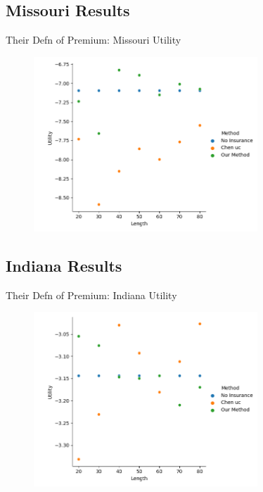 \documentclass{beamer}
\begin{document}
\subsection*{Missouri Results}
\begin{frame}{Their Defn of Premium: Missouri Utility}
    \begin{figure}
        \includegraphics[width=0.75\textwidth]{../../../output/figures/Chen Premium/Missouri_Utility_Length_ml1241.png}
    \end{figure}
\end{frame}

\subsection*{Indiana Results}
\begin{frame}{Their Defn of Premium: Indiana Utility}
    \begin{figure}
        \includegraphics[width=0.75\textwidth]{../../../output/figures/Chen Premium/Indiana_Utility_Length_ml1241.png}
    \end{figure}
\end{frame}
\end{document}
